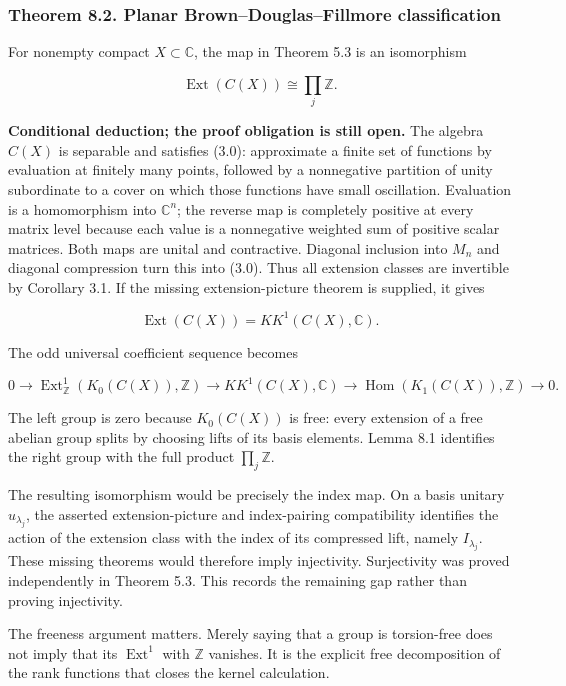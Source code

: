 \documentclass[
  11pt,
]{article}
\newcounter{none} %
\begin{document}
\subsubsection{Theorem 8.2. Planar Brown--Douglas--Fillmore
classification}\label{theorem-8.2.-planar-browndouglasfillmore-classification}

For nonempty compact \(X\subset\mathbb C\), the map in Theorem 5.3 is an
isomorphism

\[
\operatorname{Ext}(C(X))\cong\prod_j\mathbb Z.
\]

\textbf{Conditional deduction; the proof obligation is still open.} The
algebra \(C(X)\) is separable and satisfies (3.0): approximate a finite
set of functions by evaluation at finitely many points, followed by a
nonnegative partition of unity subordinate to a cover on which those
functions have small oscillation. Evaluation is a homomorphism into
\(\mathbb C^n\); the reverse map is completely positive at every matrix
level because each value is a nonnegative weighted sum of positive
scalar matrices. Both maps are unital and contractive. Diagonal
inclusion into \(M_n\) and diagonal compression turn this into (3.0).
Thus all extension classes are invertible by Corollary 3.1. If the
missing extension-picture theorem is supplied, it gives

\[
\operatorname{Ext}(C(X))=KK^1(C(X),\mathbb C).
\]

The odd universal coefficient sequence becomes

\[
0\longrightarrow
\operatorname{Ext}^1_{\mathbb Z}(K_0(C(X)),\mathbb Z)
\longrightarrow KK^1(C(X),\mathbb C)
\longrightarrow\operatorname{Hom}(K_1(C(X)),\mathbb Z)
\longrightarrow0.
\]

The left group is zero because \(K_0(C(X))\) is free: every extension of
a free abelian group splits by choosing lifts of its basis elements.
Lemma 8.1 identifies the right group with the full product
\(\prod_j\mathbb Z\).

The resulting isomorphism would be precisely the index map. On a basis
unitary \(u_{\lambda_j}\), the asserted extension-picture and
index-pairing compatibility identifies the action of the extension class
with the index of its compressed lift, namely \(I_{\lambda_j}\). These
missing theorems would therefore imply injectivity. Surjectivity was
proved independently in Theorem 5.3. This records the remaining gap
rather than proving injectivity.

The freeness argument matters. Merely saying that a group is
torsion-free does not imply that its \(\operatorname{Ext}^1\) with
\(\mathbb Z\) vanishes. It is the explicit free decomposition of the
rank functions that closes the kernel calculation.
\end{document}
